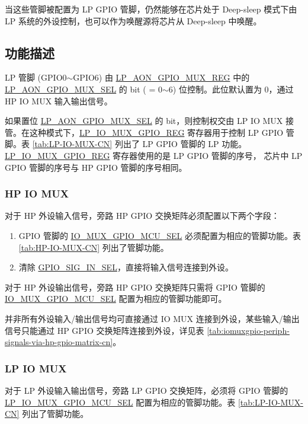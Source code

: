 \documentclass[main\_\_CN.tex]{subfiles}
\begin{document}
当这些管脚被配置为 LP GPIO 管脚，仍然能够在芯片处于 Deep-sleep 模式下由 LP 系统的外设控制，也可以作为唤醒源将芯片从 Deep-sleep 中唤醒。

\subsection{功能描述}

LP 管脚 (GPIO0$\sim$GPIO6) 由 \hyperref[regdesc:LPAONGPIOMUXREG]{LP\_AON\_GPIO\_MUX\_REG} 中的 \hyperref[fielddesc:LPAONGPIOMUXSEL] {LP\_AON\_GPIO\_MUX\_SEL} 的 bit\regindex{[n]} ( = 0$\sim$6) 位控制。此位默认置为 0，通过 HP IO MUX 输入输出信号。

如果置位 \hyperref[fielddesc:LPAONGPIOMUXSEL] {LP\_AON\_GPIO\_MUX\_SEL} 的 bit\regindex{[n]}，则控制权交由 LP IO MUX 接管。在这种模式下，\hyperref[regdesc:LPIOMUXGPIONREG]{LP\_IO\_MUX\_GPIO\_REG} 寄存器用于控制 LP GPIO 管脚。表 \ref{tab:LP-IO-MUX-CN} 列出了 LP GPIO 管脚的 LP 功能。\hyperref[regdesc:LPIOMUXGPIONREG]{LP\_IO\_MUX\_GPIO\_REG} 寄存器使用的是 LP GPIO 管脚的序号， \chipname{} 芯片中 LP GPIO 管脚的序号与 HP GPIO 管脚的序号相同。

\subsubsection{HP IO MUX}
对于 HP 外设输入信号，旁路 HP GPIO 交换矩阵必须配置以下两个字段：

\begin{enumerate}
\item GPIO 管脚的 \hyperref[fielddesc:IOMUXGPIONMCUSEL]{IO\_MUX\_GPIO\_MCU\_SEL} 必须配置为相应的管脚功能。表 \ref{tab:HP-IO-MUX-CN} 列出了管脚功能。
\item 清除 \hyperref[fielddesc:GPIOSIGNINSEL]{GPIO\_SIG\_IN\_SEL}，直接将输入信号连接到外设。
\end{enumerate}

对于 HP 外设输出信号，旁路 HP GPIO 交换矩阵只需将 GPIO 管脚的 \hyperref[fielddesc:IOMUXGPIONMCUSEL]{IO\_MUX\_GPIO\_MCU\_SEL} 配置为相应的管脚功能即可。

\begin{tiplisting}
并非所有外设输入/输出信号均可直接通过 IO MUX 连接到外设，某些输入/输出信号只能通过 HP GPIO 交换矩阵连接到外设，详见表 \ref{tab:iomuxgpio-periph-signals-via-hp-gpio-matrix-cn}。
\end{tiplisting}

\subsubsection{LP IO MUX}
对于 LP 外设输入输出信号，旁路 LP GPIO 交换矩阵，必须将 GPIO 管脚的 \hyperref[fielddesc:LPIOMUXGPIONMCUSEL] {LP\_IO\_MUX\_GPIO\_MCU\_SEL} 配置为相应的管脚功能。表 \ref{tab:LP-IO-MUX-CN} 列出了管脚功能。
\end{document}
